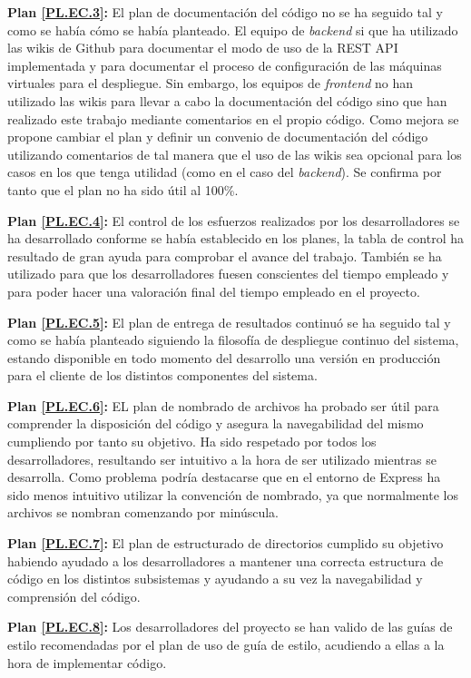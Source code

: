 \documentclass{article}
\begin{document}
\textbf{Plan \ref{PL.EC.3}:}
El plan de documentación del código no se ha seguido tal y como se había cómo se había planteado. El equipo de \textit{backend} si que ha utilizado las wikis de Github para documentar el modo de uso de la REST API implementada y para documentar el proceso de configuración de las máquinas virtuales para el despliegue. Sin embargo, los equipos de \textit{frontend} no han utilizado las wikis para llevar a cabo la documentación del código sino que han realizado este trabajo mediante comentarios en el propio código. Como mejora se propone cambiar el plan y definir un convenio de documentación del código utilizando comentarios de tal manera que el uso de las wikis sea opcional para los casos en los que tenga utilidad (como en el caso del \textit{backend}). Se confirma por tanto que el plan no ha sido útil al 100\%.

\textbf{Plan \ref{PL.EC.4}:}
El control de los esfuerzos realizados por los desarrolladores se ha desarrollado conforme se había establecido en los planes, la tabla de control ha resultado de gran ayuda para comprobar el avance del trabajo. También se ha utilizado para que los desarrolladores fuesen conscientes del tiempo empleado y para poder hacer una valoración final del tiempo empleado en el proyecto.

\textbf{Plan \ref{PL.EC.5}:}
El plan de entrega de resultados continuó se ha seguido tal y como se había planteado siguiendo la filosofía de despliegue continuo del sistema, estando disponible en todo momento del desarrollo una versión en producción para el cliente de los distintos componentes del sistema.

\textbf{Plan \ref{PL.EC.6}:}
EL plan de nombrado de archivos ha probado ser útil para comprender la disposición del código y asegura la navegabilidad del mismo cumpliendo por tanto su objetivo. Ha sido respetado por todos los desarrolladores, resultando ser intuitivo a la hora de ser utilizado mientras se desarrolla. Como problema podría destacarse que en el entorno de Express ha sido menos intuitivo utilizar la convención de nombrado, ya que normalmente los archivos se nombran comenzando por minúscula.

\textbf{Plan \ref{PL.EC.7}:}
El plan de estructurado de directorios cumplido su objetivo habiendo ayudado a los desarrolladores a mantener una correcta estructura de código en los distintos subsistemas y ayudando a su vez la navegabilidad y comprensión del código.

\textbf{Plan \ref{PL.EC.8}:}
Los desarrolladores del proyecto se han valido de las guías de estilo recomendadas por el plan de uso de guía de estilo, acudiendo a ellas a la hora de implementar código.
\end{document}
